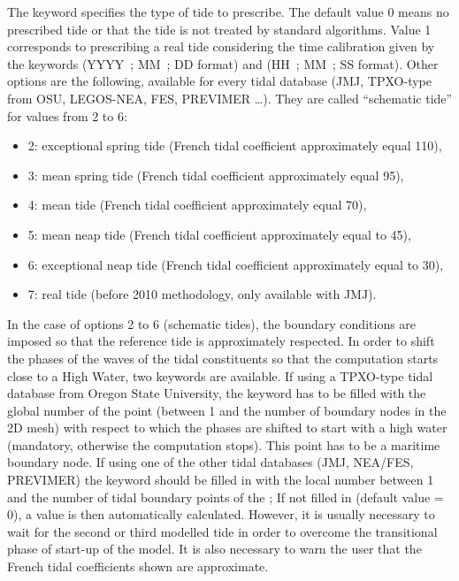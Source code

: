 The keyword  specifies the type of tide to prescribe. The default value
0 means no prescribed tide or that the tide is not treated by standard
algorithms. Value 1 corresponds to prescribing a real tide considering the time
calibration given by the keywords  (YYYY~; MM~;
DD format) and  (HH~; MM~; SS format). Other
options are the following, available for every tidal database (JMJ,
TPXO-type from OSU, LEGOS-NEA, FES, PREVIMER \ldots).
They are called “schematic tide” for values from 2 to 6:

\begin{itemize}
\item 2: exceptional spring tide (French tidal coefficient approximately equal
110),

\item 3: mean spring tide (French tidal coefficient approximately equal 95),

\item 4: mean tide (French tidal coefficient approximately equal 70),

\item 5: mean neap tide (French tidal coefficient approximately equal to 45),

\item 6: exceptional neap tide (French tidal coefficient approximately equal
to 30),

\item 7: real tide (before 2010 methodology, only available with JMJ).
\end{itemize}

In the case of options 2 to 6 (schematic tides), the boundary conditions are
imposed so that the reference tide is approximately respected.
In order to shift the phases of the waves of the tidal constituents so that
the computation starts close to a High Water, two keywords are available.
If using a TPXO-type tidal database from Oregon State University, the keyword
 has to be filled
with the global number of the point (between 1 and the number of boundary
nodes in the 2D mesh) with respect to which the phases are shifted
to start with a high water (mandatory, otherwise the computation stops).
This point has to be a maritime boundary node.
If using one of the other tidal databases (JMJ, NEA/FES, PREVIMER) the keyword
 should be filled in
with the local number between 1 and the number of tidal boundary points of the
; If not filled in (default value = 0), a value
is then automatically calculated. However, it is usually necessary to
wait for the second or third modelled tide in order to overcome the
transitional phase of start-up of the model. It is also necessary to warn the
user that the French tidal coefficients shown are approximate.

